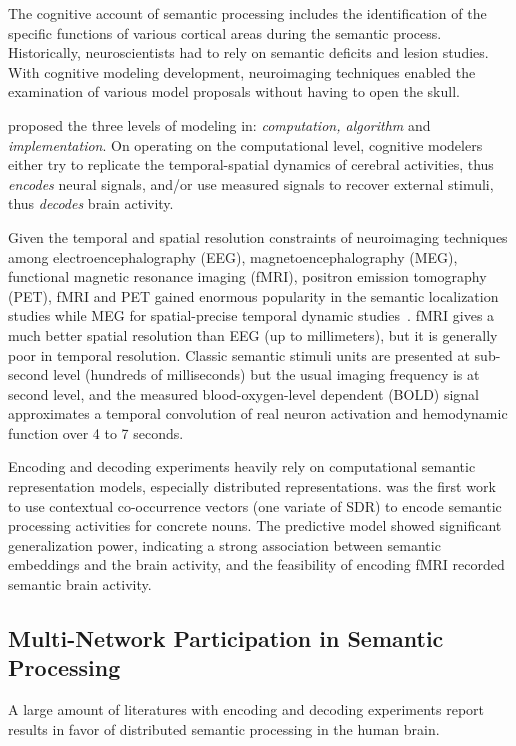 The cognitive account of semantic processing includes the identification of the specific functions of various cortical areas during the semantic process. Historically, neuroscientists had to rely on semantic deficits and lesion studies. With cognitive modeling development, neuroimaging techniques enabled the examination of various model proposals without having to open the skull. 

\textcite{marrVisionComputationalInvestigation1982} proposed the three levels of modeling in: \emph{computation, algorithm} and \emph{implementation}. On operating on the computational level, cognitive modelers either try to replicate the temporal-spatial dynamics of cerebral activities, thus \emph{encodes} neural signals, and/or use measured signals to recover external stimuli, thus \emph{decodes} brain activity. 

Given the temporal and spatial resolution constraints of neuroimaging techniques among electroencephalography (EEG), magnetoencephalography (MEG), functional magnetic resonance imaging (fMRI), positron emission tomography (PET), fMRI and PET gained enormous popularity in the semantic localization studies while MEG for spatial-precise temporal dynamic studies~\parencite{molloOscillatoryDynamicsSupporting2017}. fMRI gives a much better spatial resolution than EEG (up to millimeters), but it is generally poor in temporal resolution. Classic semantic stimuli units are presented at sub-second level (hundreds of milliseconds) but the usual imaging frequency is at second level, and the measured blood-oxygen-level dependent (BOLD) signal approximates a temporal convolution of real neuron activation and hemodynamic function over 4 to 7 seconds.

Encoding and decoding experiments heavily rely on computational semantic representation models, especially distributed representations. \textcite{mitchellPredictingHumanBrain2008} was the first work to use contextual co-occurrence vectors (one variate of SDR) to encode semantic processing activities for concrete nouns. The predictive model showed significant generalization power, indicating a strong association between semantic embeddings and the brain activity, and the feasibility of encoding fMRI recorded semantic brain activity.

\subsection{Multi-Network Participation in Semantic Processing}
\label{subsec:multinetworkParticipation}
A large amount of literatures with encoding and decoding experiments report results in favor of distributed semantic processing in the human brain. 

